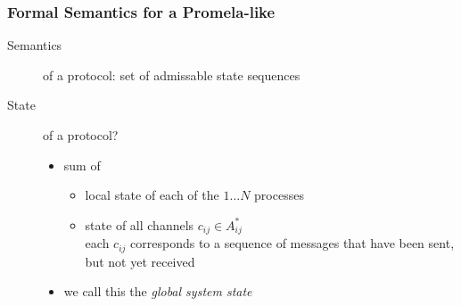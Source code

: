 \documentclass[a4paper, 10pt]{article}
\begin{document}
\subsubsection*{Formal Semantics for a Promela-like}
\begin{description}
    \item[Semantics] of a protocol: set of admissable state sequences
    \item[State] of a protocol?
    \begin{itemize}
        \item sum of
        \begin{itemize}
            \item local state of each of the $1\dots N$ processes
            \item state of all channels $c_{ij}\in A_{ij}^*$ \\
            each $c_{ij}$ corresponds to a sequence of messages that have been sent, but not yet received
        \end{itemize}
        \item we call this the \emph{global system state}
    \end{itemize}
\end{description}
\end{document}
